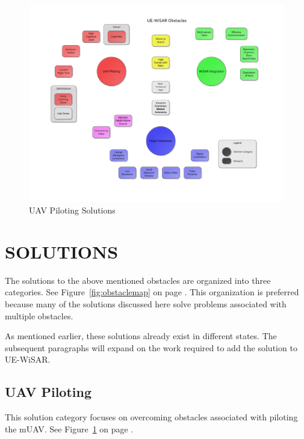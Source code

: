 \documentclass[12pt]{IEEEtran}
\begin{document}
\begin{figure}[htp]
	\vspace{-80pt}
	\hspace{-90pt}
	\includegraphics[keepaspectratio=true, width=\paperheight,
	height=\paperheight, page=3, angle=90, scale=0.95,
	trim=10 0 10 0]{obstacle_solution_map.pdf}
	\caption{UAV Piloting Solutions}
	\label{fig:uavpilotingmap}
\end{figure}

\section{SOLUTIONS}
The solutions to the above mentioned obstacles are organized into three categories.
See Figure~\ref{fig:obstaclemap} on page
\pageref{fig:obstaclemap}.  This organization is preferred because many of
the solutions discussed here solve problems associated with multiple obstacles. 

As mentioned earlier, these solutions already exist in different states.  The
subsequent paragraphs will expand on the work required to add the solution to
UE-WiSAR.

\subsection{UAV Piloting}
This solution category focuses on overcoming obstacles
associated with piloting the mUAV.  See Figure~\ref{fig:uavpilotingmap} on page
\pageref{fig:uavpilotingmap}.


\end{document}
